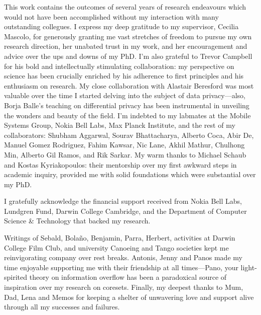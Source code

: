 
\begin{acknowledgements}
This work contains the outcomes of several years of research endeavours which would not have been accomplished without my interaction with many outstanding collegues. I express my deep gratitude to my supervisor, Cecilia Mascolo, for generously granting me vast stretches of freedom to pursue my own research direction, her unabated trust in my work, and her encouragement and advice over the ups and downs of my PhD. I'm also grateful to Trevor Campbell for his bold and intellectually stimulating collaboration: my perspective on science has been crucially enriched by his adherence to first principles and his enthusiasm on research. My close collaboration with Alastair Beresford was most valuable over the time I started delving into the subject of data privacy---also, Borja Balle's teaching on differential privacy has been instrumental in unveiling the wonders and beauty of the field. 
I'm indebted to my labmates at the Mobile Systems Group, Nokia Bell Labs, Max Planck Institute, and the rest of my collaborators:
Shubham Aggarwal, Sourav Bhattacharya, Alberto Coca, Abir De, Manuel Gomez Rodriguez, Fahim Kawsar, Nic Lane,  Akhil Mathur, Chulhong Min, Alberto Gil Ramos, and Rik Sarkar. My warm thanks to Michael Schaub and Kostas Kyriakopoulos: their mentorship over my first awkward steps in academic inquiry, provided me with solid foundations which were substantial over my PhD. %

I gratefully acknowledge the financial support received from Nokia Bell Labs, Lundgren Fund, Darwin College Cambridge, and the Department of Computer Science \& Technology that backed my research. 

Writings of Sebald, Bola{\~{n}}o, Benjamin, Parra, Herbert, activities at Darwin College Film Club, and university Canoeing and Tango societies kept me reinvigorating company over rest breaks. Antonis, Jenny and Panos made my time enjoyable supporting me with their friendship at all times---Pano, your light-spirited theory on information overflow has been a paradoxical source of inspiration over my research on coresets. Finally, my deepest thanks to Mum, Dad, Lena and Memos for keeping a shelter of unwavering love and support alive through all my successes and failures.
\end{acknowledgements}
